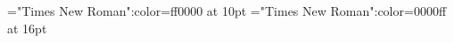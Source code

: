 \documentclass[a4paper]{article}
\begin{document}
 
\pagestyle{plain} 
\sloppy 
\setlength{\parfillskip}{0pt plus 1fil} 
\font\a="Times New Roman":color=ff0000 at 10pt
\font\ba="Times New Roman":color=0000ff at 16pt

\pagestyle{fancy} 

\begin{comment}


\ba{class b}\end{comment}
 


\begin{comment}
\ba{class b}\end{comment}
\end{document}
